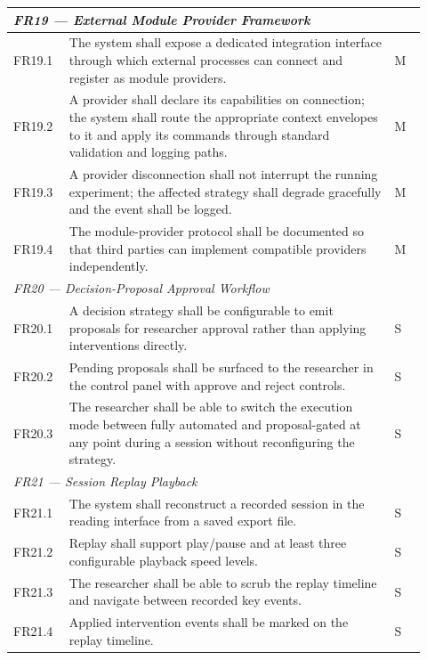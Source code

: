 \begin{longtable}{%
  p{0.12\linewidth}
  p{0.73\linewidth}
  p{0.07\linewidth}
}
\multicolumn{3}{l}{\textit{FR19 — External Module Provider Framework}} \\
\midrule
FR19.1 & The system shall expose a dedicated integration interface through
         which external processes can connect and register as module providers. & M \\
FR19.2 & A provider shall declare its capabilities on connection; the system
         shall route the appropriate context envelopes to it and apply its
         commands through standard validation and logging paths. & M \\
FR19.3 & A provider disconnection shall not interrupt the running experiment;
         the affected strategy shall degrade gracefully and the event shall
         be logged. & M \\
FR19.4 & The module-provider protocol shall be documented so that third
         parties can implement compatible providers independently. & M \\
\midrule

\multicolumn{3}{l}{\textit{FR20 — Decision-Proposal Approval Workflow}} \\
\midrule
FR20.1 & A decision strategy shall be configurable to emit proposals for
         researcher approval rather than applying interventions directly. & S \\
FR20.2 & Pending proposals shall be surfaced to the researcher in the control
         panel with approve and reject controls. & S \\
FR20.3 & The researcher shall be able to switch the execution mode between
         fully automated and proposal-gated at any point during a session
         without reconfiguring the strategy. & S \\
\midrule

\multicolumn{3}{l}{\textit{FR21 — Session Replay Playback}} \\
\midrule
FR21.1 & The system shall reconstruct a recorded session in the reading
         interface from a saved export file. & S \\
FR21.2 & Replay shall support play/pause and at least three configurable
         playback speed levels. & S \\
FR21.3 & The researcher shall be able to scrub the replay timeline and
         navigate between recorded key events. & S \\
FR21.4 & Applied intervention events shall be marked on the replay timeline. & S \\
\midrule


\end{longtable}
